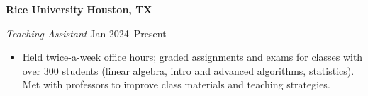 \textbf{Rice University} \hfill \textbf{Houston, TX}\par
\textit{Teaching Assistant} \hfill Jan 2024--Present

\begin{itemize}
	\item Held twice-a-week office hours; graded assignments and exams for classes with over 300 students (linear algebra, intro and advanced algorithms, statistics). Met with professors to improve class materials and teaching strategies.
\end{itemize}\par

